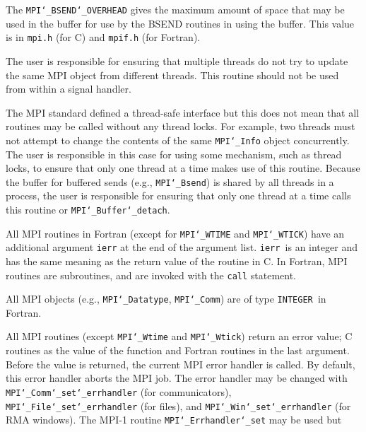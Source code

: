 The {\tt MPI{\tt \char`\_}BSEND{\tt \char`\_}OVERHEAD} gives the maximum amount of space that may be used in
the buffer for use by the BSEND routines in using the buffer.  This value
is in {\tt mpi.h} (for C) and {\tt mpif.h} (for Fortran).
\par
{}
\par
The user is responsible for ensuring that multiple threads do not try to
update the same MPI object from different threads.  This routine should
not be used from within a signal handler.
\par
The MPI standard defined a thread-safe interface but this does not
mean that all routines may be called without any thread locks.  For
example, two threads must not attempt to change the contents of the
same {\tt MPI{\tt \char`\_}Info} object concurrently.  The user is responsible in this
case for using some mechanism, such as thread locks, to ensure that
only one thread at a time makes use of this routine.
Because the buffer for buffered sends (e.g., {\tt MPI{\tt \char`\_}Bsend}) is shared by all
threads in a process, the user is responsible for ensuring that only
one thread at a time calls this routine or {\tt MPI{\tt \char`\_}Buffer{\tt \char`\_}detach}.
\par
{}
All MPI routines in Fortran (except for {\tt MPI{\tt \char`\_}WTIME} and {\tt MPI{\tt \char`\_}WTICK}) have
an additional argument {\tt ierr} at the end of the argument list.  {\tt ierr
}is an integer and has the same meaning as the return value of the routine
in C.  In Fortran, MPI routines are subroutines, and are invoked with the
{\tt call} statement.
\par
All MPI objects (e.g., {\tt MPI{\tt \char`\_}Datatype}, {\tt MPI{\tt \char`\_}Comm}) are of type {\tt INTEGER
}in Fortran.
\par
{}
\par
All MPI routines (except {\tt MPI{\tt \char`\_}Wtime} and {\tt MPI{\tt \char`\_}Wtick}) return an error value;
C routines as the value of the function and Fortran routines in the last
argument.  Before the value is returned, the current MPI error handler is
called.  By default, this error handler aborts the MPI job.  The error handler
may be changed with {\tt MPI{\tt \char`\_}Comm{\tt \char`\_}set{\tt \char`\_}errhandler} (for communicators),
{\tt MPI{\tt \char`\_}File{\tt \char`\_}set{\tt \char`\_}errhandler} (for files), and {\tt MPI{\tt \char`\_}Win{\tt \char`\_}set{\tt \char`\_}errhandler} (for
RMA windows).  The MPI-1 routine {\tt MPI{\tt \char`\_}Errhandler{\tt \char`\_}set} may be used but
